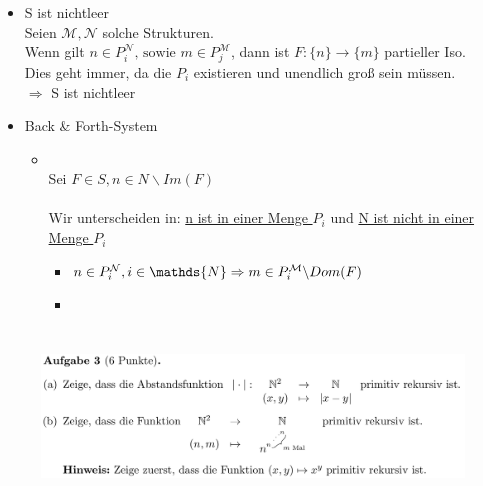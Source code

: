 \documentclass[a4paper]{scrartcl}%
\begin{document}
\begin{itemize}
            \begin{itemize}
                \item S ist nichtleer\\
                    Seien $\mathcal{M}, \mathcal{N}$ solche Strukturen.\\
                    Wenn gilt $n \in P_i^\mathcal{N} \text{, sowie } m \in P_j^\mathcal{M}$, dann ist $F: \{n\} \rightarrow \{m\}$ partieller Iso.\\
                    Dies geht immer, da die $P_i$ existieren und unendlich groß sein müssen.\\
                    $\Rightarrow$ S ist nichtleer\\
                \item Back \& Forth-System\\
                    \begin{itemize}
                        \item {}\\
                            Sei $F \in S, n \in N\backslash Im(F)$\\
                            \\Wir unterscheiden in: \underline{n ist in einer Menge $P_i$} und \underline{N ist nicht in einer Menge $P_i$}\\
                            \begin{itemize}
                                \item $n \in P_i^\mathcal{N}, i \in \mathds{N}\\
                                    \Rightarrow m \in P_i^\mathcal{M} \backslash Dom(F)$\\
                                \item 
                            \end{itemize}
                            
                    \end{itemize}
            \end{itemize}
    \end{itemize}

\section*{}%
\label{sec:aufgabe_3}

    \begin{figure}[H]
        \includegraphics[scale=0.3]{./A-3.png}
        \label{fig:}
    \end{figure}
\end{document}
